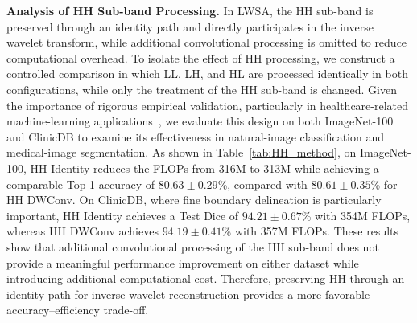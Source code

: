 \documentclass[a4paper,fleqn]{cas-dc}
\begin{document}
{\color{green}
\textbf{Analysis of HH Sub-band Processing.}
In LWSA, the HH sub-band is preserved through an identity path and directly participates in the inverse wavelet transform, while additional convolutional processing is omitted to reduce computational overhead. To isolate the effect of HH processing, we construct a controlled comparison in which LL, LH, and HL are processed identically in both configurations, while only the treatment of the HH sub-band is changed. Given the importance of rigorous empirical validation, particularly in healthcare-related machine-learning applications~\cite{ganesan2024navigating}, we evaluate this design on both ImageNet-100 and ClinicDB to examine its effectiveness in natural-image classification and medical-image segmentation. As shown in Table~\ref{tab:HH_method}, on ImageNet-100, HH Identity reduces the FLOPs from 316M to 313M while achieving a comparable Top-1 accuracy of $80.63 \pm 0.29$\%, compared with $80.61 \pm 0.35$\% for HH DWConv. On ClinicDB, where fine boundary delineation is particularly important, HH Identity achieves a Test Dice of $94.21 \pm 0.67$\% with 354M FLOPs, whereas HH DWConv achieves $94.19 \pm 0.41$\% with 357M FLOPs. These results show that additional convolutional processing of the HH sub-band does not provide a meaningful performance improvement on either dataset while introducing additional computational cost. Therefore, preserving HH through an identity path for inverse wavelet reconstruction provides a more favorable accuracy--efficiency trade-off.
}
\end{document}

